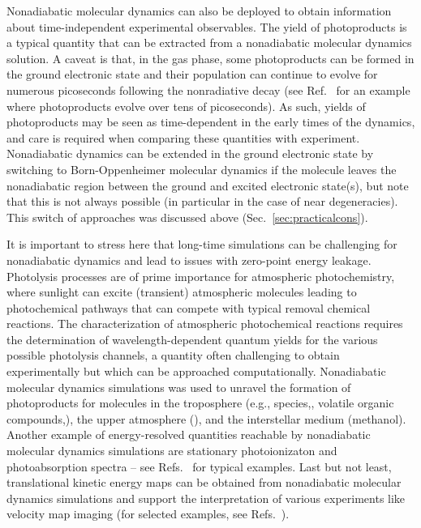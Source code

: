 \documentclass[9pt,bestpractices]{livecoms}
\begin{document}
Nonadiabatic molecular dynamics can also be deployed to obtain information about time-independent experimental observables. The yield of photoproducts is a typical quantity that can be extracted from a nonadiabatic molecular dynamics solution. A caveat is that, in the gas phase, some photoproducts can be formed in the ground electronic state\cite{mignolet2016rich} and their population can continue to evolve for numerous picoseconds following the nonradiative decay (see Ref.~ for an example where photoproducts evolve over tens of picoseconds). As such, yields of photoproducts may be seen as time-dependent in the early times of the dynamics, and care is required when comparing these quantities with experiment. Nonadiabatic dynamics can be extended in the ground electronic state by switching to Born-Oppenheimer molecular dynamics if the molecule leaves the nonadiabatic region between the ground and excited electronic state(s), but note that this is not always possible (in particular in the case of near degeneracies). This switch of approaches was discussed above (Sec.~\ref{sec:practicalcons}). 

It is important to stress here that long-time simulations can be challenging for nonadiabatic dynamics\cite{Mukherjeelongtime2025} and lead to issues with zero-point energy leakage.\cite{PersicoZPE2023} Photolysis processes are of prime importance for atmospheric photochemistry, where sunlight can excite (transient) atmospheric molecules leading to photochemical pathways that can compete with typical removal chemical reactions. The characterization of atmospheric photochemical reactions requires the determination of wavelength-dependent quantum yields for the various possible photolysis channels, a quantity often challenging to obtain experimentally\cite{Curchodatmophotochem2024} but which can be approached computationally.\cite{Prljphotolysis2020} Nonadiabatic molecular dynamics simulations was used to unravel the formation of photoproducts for molecules in the troposphere (e.g.,  species,\cite{rocasanjuan2020mercury}, volatile organic compounds,\cite{marsili2022theoretical,HuttonPA2022}), the upper atmosphere (\cite{carmona-garcia2021hoso}), and the interstellar medium (methanol\cite{cigrang2024methanol}). Another example of energy-resolved quantities reachable by nonadiabatic molecular dynamics simulations are stationary photoionizaton and photoabsorption spectra -- see Refs.~\cite{toddaims,taylor2018phenol,parkes2024thiophene} for typical examples. Last but not least, translational kinetic energy maps can be obtained from nonadiabatic molecular dynamics simulations and support the interpretation of various experiments like velocity map imaging (for selected examples, see Refs.~).
\end{document}
